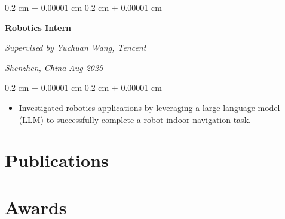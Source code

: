 \documentclass[11pt, letterpaper]{article}
\newenvironment{highlights}{
    \begin{itemize}[
        topsep=0.10 cm,
        parsep=0.10 cm,
        partopsep=0pt,
        itemsep=0pt,
        leftmargin=0.4 cm + 10pt
    ]
}{
    \end{itemize}
} %
\newenvironment{onecolentry}{
    \begin{adjustwidth}{
        0.2 cm + 0.00001 cm
    }{
        0.2 cm + 0.00001 cm
    }
}{
    \end{adjustwidth}
} %
\newenvironment{twocolentry}[2][]{
    \onecolentry{}
    \def\secondColumn{#2}
    \setcolumnwidth{\fill, 4.5 cm}
    \begin{paracol}{2}
}{
    \switchcolumn{}\raggedleft{}\secondColumn{}
    \end{paracol}
    \endonecolentry{}
} %
\let\hrefWithoutArrow\href{}
\renewcommand{\href}[2]{\hrefWithoutArrow{#1}{\ifthenelse{\equal{#2}{}}{ }{#2 }\raisebox{.15ex}{\footnotesize \faExternalLink*}}}
\begin{document}
\vspace{0.3 cm}

\begin{twocolentry}{
    \textit{Shenzhen, China}
    \textit{Aug 2025}}
    \textbf{Robotics Intern}
    
    \textit{Supervised by Yuchuan Wang, Tencent}
\end{twocolentry}

\vspace{0.15 cm}
\begin{onecolentry}
    \begin{highlights}
        \item Investigated robotics applications by leveraging a large language model (LLM) to successfully complete a robot indoor navigation task.
    \end{highlights}
\end{onecolentry}

\section{Publications}

\begin{samepage}
        
        

    
\end{samepage}

\section{Awards}

    
\end{document}
